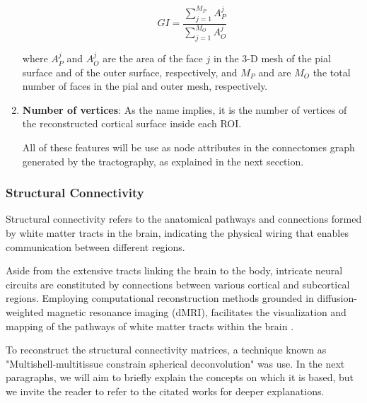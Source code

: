 \documentclass{cys}
\begin{document}
\begin{enumerate}
\begin{equation}
GI=\frac{\sum_{j=1}^{M_P}A_P^j}{\sum_{j=1}^{M_O}A_O^j}
\end{equation}

where $A_P^j$ and $A_O^j$ are the area of the face $j$ in the 3-D mesh of the pial surface and of the outer surface, respectively, and $M_P$ and are $M_O$ the total number of faces in the pial and outer mesh, respectively.
\\
\item \textbf{Number of vertices}: As the name implies, it is the number of vertices of the reconstructed cortical surface inside each ROI.

\bigskip
All of these features will be use as node attributes in the connectomes graph generated by the tractography, as explained in the next secction. 

\end{enumerate}

\bigskip

\bigskip

\subsubsection{Structural Connectivity}

Structural connectivity refers to the anatomical pathways and connections formed by white matter tracts in the brain, indicating the physical wiring that enables communication between different regions.

\bigskip
Aside from the extensive tracts linking the brain to the body, intricate neural circuits are constituted by connections between various cortical and subcortical regions. Employing computational reconstruction methods grounded in diffusion-weighted magnetic resonance imaging (dMRI), facilitates the visualization and mapping of the pathways of white matter tracts within the brain \cite{maier2017challenge}.

\bigskip
To reconstruct the structural connectivity matrices, a technique known as "Multishell-multitissue constrain spherical deconvolution" was use. In the next paragraphs, we will aim to briefly explain the concepts on which it is based, but we invite the reader to refer to the citated works for deeper explanations.
\end{document}
